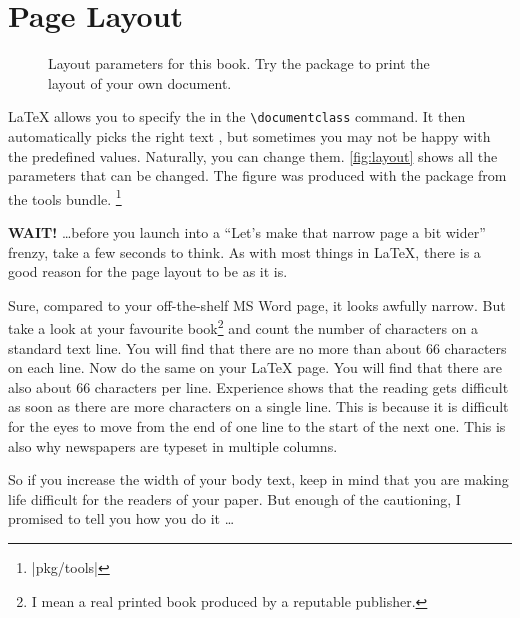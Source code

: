 \section{Page Layout}

\begin{figure}[!hp]
  \begin{center}
    \makeatletter\@mylayout\makeatother
  \end{center}
  \vspace*{1.8cm}
  \caption[Layout parameters for this book.]{Layout parameters for this book. Try the  package to print the layout of your own document.}\label{fig:layout}
\end{figure}

\LaTeX{} allows you to specify the  in the
\verb|\documentclass| command. It then automatically picks the right
text , but sometimes you may not be happy with
the predefined values. Naturally, you can change them.
\thispagestyle{fancyplain}
\autoref{fig:layout} shows all the parameters that can be changed.
The figure was produced with the  package from the tools bundle.%
\footnote{\CTANref|pkg/tools|}

\textbf{WAIT!} \ldots before you launch into a ``Let's make that
narrow page a bit wider'' frenzy, take a few seconds to think. As with
most things in \LaTeX, there is a good reason for the page layout to
be as it is.

Sure, compared to your off-the-shelf MS Word page, it looks awfully
narrow. But take a look at your favourite book\footnote{I mean a real
  printed book produced by a reputable publisher.} and count the number
of characters on a standard text line. You will find that there are no
more than about 66 characters on each line. Now do the same on your
\LaTeX{} page. You will find that there are also about 66 characters
per line.  Experience shows that the reading gets difficult as soon as
there are more characters on a single line. This is because it is
difficult for the eyes to move from the end of one line to the start of the next one.
This is also why newspapers are typeset in multiple columns.

So if you increase the width of your body text, keep in mind that you
are making life difficult for the readers of your paper. But enough
of the cautioning, I promised to tell you how you do it \ldots

